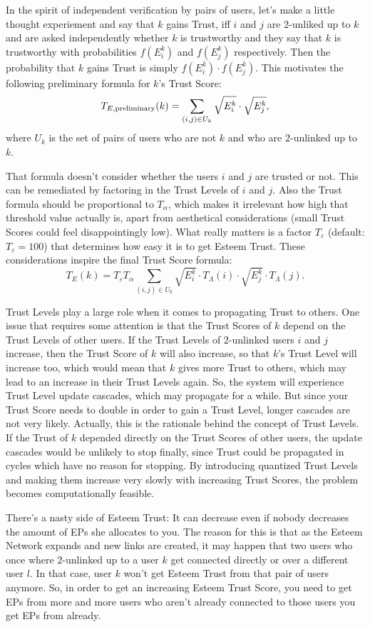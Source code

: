\documentclass[a4paper,12pt]{scrartcl}
\newcounter{formula}
\newcounter{rationale}
\begin{document}
In the spirit of independent verification by pairs of users, let's make a little thought experiement and say that $k$ gains Trust, iff $i$ and $j$ are $2$-unliked up to $k$ and are asked independently whether $k$ is trustworthy and they say that $k$ is trustworthy with probabilities $f(E^k_i)$ and $f(E^k_j)$ respectively. Then the probability that $k$ gains Trust is simply $f(E^k_i) \cdot f(E^k_j)$. This motivates the following preliminary formula for $k$'s Trust Score:
$$ T_{E,\mbox{{\scriptsize  preliminary}}}(k) = \sum_{(i,j)\in U_k} \sqrt{E^k_i} \cdot \sqrt{E^k_j},$$
where $U_k$ is the set of pairs of users who are not $k$ and who are $2$-unlinked up to $k$. 

That formula doesn't consider whether the users $i$ and $j$ are trusted or not. This can be remediated by factoring in the Trust Levels of $i$ and $j$. Also the Trust formula should be proportional to $T_{\alpha}$, which makes it irrelevant how high that threshold value actually is, apart from aesthetical considerations (small Trust Scores could feel disappointingly low). What really matters is a factor $T_{\varepsilon}$ (default: $T_{\varepsilon} = 100$) that determines how easy it is to get Esteem Trust. These considerations inspire the final Trust Score formula:
$$T_E(k) = T_{\varepsilon} T_{\alpha} \sum_{(i,j)\in U_k} \sqrt{E^k_i} \cdot T_{\Lambda}(i) \cdot \sqrt{E^k_j} \cdot T_{\Lambda}(j).$$

Trust Levels play a large role when it comes to propagating Trust to others. One issue that requires some attention is that the Trust Scores of $k$ depend on the Trust Levels of other users. If the Trust Levels of $2$-unlinked users $i$ and $j$ increase, then the Trust Score of $k$ will also increase, so that $k$'s Trust Level will increase too, which would mean that $k$ gives more Trust to others, which may lead to an increase in their Trust Levels again. So, the system will experience Trust Level update cascades, which may propagate for a while. But since your Trust Score needs to double in order to gain a Trust Level, longer cascades are not very likely. Actually, this is the rationale behind the concept of Trust Levels. If the Trust of $k$ depended directly on the Trust Scores of other users, the update cascades would be unlikely to stop finally, since Trust could be propagated in cycles which have no reason for stopping. By introducing quantized Trust Levels and making them increase very slowly with 
increasing Trust Scores, the problem becomes computationally feasible.

There's a nasty side of Esteem Trust: It can decrease even if nobody decreases the amount of EPs she allocates to you. The reason for this is that as the Esteem Network expands and new links are created, it may happen that two users who once where $2$-unlinked up to a user $k$ get connected directly or over a different user $l$. In that case, user $k$ won't get Esteem Trust from that pair of users anymore. So, in order to get an increasing Esteem Trust Score, you need to get EPs from more and more users who aren't already connected to those users you get EPs from already.
\end{document}
